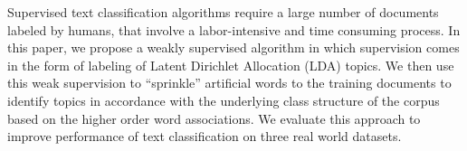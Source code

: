 Supervised text classification algorithms require a large number of documents labeled by humans, that involve a labor-intensive and time consuming process. In this paper, we propose a weakly supervised algorithm in which supervision comes in the form of labeling of Latent Dirichlet Allocation (LDA) topics. We then use this weak supervision to ``sprinkle'' artificial words to the training documents to identify topics in accordance with the underlying class structure of the corpus based on the higher order word associations. We evaluate this approach to improve performance of text classification on three real world datasets.
